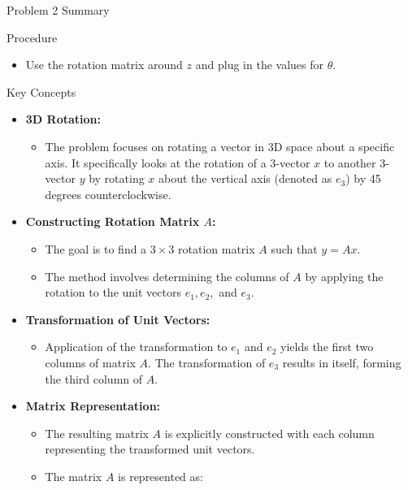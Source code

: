 \begin{summary}{Problem 2 Summary}
    \begin{statement}{Procedure}
        \begin{itemize}
            \item Use the rotation matrix around $z$ and plug in the values for $\theta$.
        \end{itemize}
    \end{statement}
    \begin{statement}{Key Concepts}
        \begin{itemize}
            \item \textbf{3D Rotation:}
            \begin{itemize}
                \item The problem focuses on rotating a vector in 3D space about a specific axis. It specifically looks at the rotation of a 3-vector $x$ to another 3-vector $y$ by rotating $x$ about 
                the vertical axis (denoted as $e_{3}$) by 45 degrees counterclockwise.
            \end{itemize}
            \item \textbf{Constructing Rotation Matrix $A$:}
            \begin{itemize}
                \item The goal is to find a $3 \times 3$ rotation matrix $A$ such that $y = Ax$.
                \item The method involves determining the columns of $A$ by applying the rotation to the unit vectors $e_{1}, e_{2},$ and $e_{3}$.
            \end{itemize}
            \item \textbf{Transformation of Unit Vectors:}
            \begin{itemize}
                \item Application of the transformation to $e_{1}$ and $e_{2}$ yields the first two columns of matrix $A$. The transformation of $e_{3}$ results in itself, forming the third column of $A$.
            \end{itemize}
            \item \textbf{Matrix Representation:}
            \begin{itemize}
                \item The resulting matrix $A$ is explicitly constructed with each column representing the transformed unit vectors.
                \item The matrix $A$ is represented as:

\end{itemize}
\end{itemize}
\end{statement}
\end{summary}
